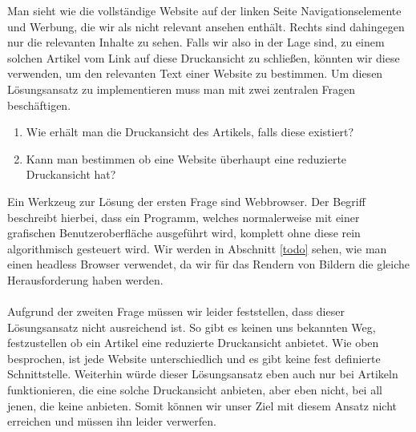 Man sieht wie die vollständige Website auf der linken Seite Navigationselemente und Werbung, die wir als nicht relevant ansehen enthält. Rechts sind dahingegen nur die relevanten Inhalte zu sehen. Falls wir also in der Lage sind, zu einem solchen Artikel vom Link auf diese Druckansicht zu schließen, könnten wir diese verwenden, um den relevanten Text einer Website zu bestimmen. Um diesen Lösungsansatz zu implementieren muss man mit zwei zentralen Fragen beschäftigen.
\begin{enumerate}
	\item Wie erhält man die Druckansicht des Artikels, falls diese existiert?
	\item Kann man bestimmen ob eine Website überhaupt eine reduzierte Druckansicht hat? 
\end{enumerate}
Ein Werkzeug zur Lösung der ersten Frage sind  Webbrowser. Der Begriff  beschreibt hierbei, dass ein Programm, welches normalerweise mit einer grafischen Benutzeroberfläche ausgeführt wird, komplett ohne diese rein algorithmisch gesteuert wird. Wir werden in Abschnitt \ref{todo} sehen, wie man einen headless Browser verwendet, da wir für das Rendern von Bildern die gleiche Herausforderung haben werden. \\ \\
Aufgrund der zweiten Frage müssen wir leider feststellen, dass dieser Lösungsansatz nicht ausreichend ist. So gibt es keinen uns bekannten Weg, festzustellen ob ein Artikel eine reduzierte Druckansicht anbietet. Wie oben besprochen, ist jede Website unterschiedlich und es gibt keine fest definierte Schnittstelle. Weiterhin würde dieser Lösungsansatz eben auch nur bei Artikeln funktionieren, die eine solche Druckansicht anbieten, aber eben nicht, bei all jenen, die keine anbieten. Somit können wir unser Ziel mit diesem Ansatz nicht erreichen und müssen ihn leider verwerfen.


